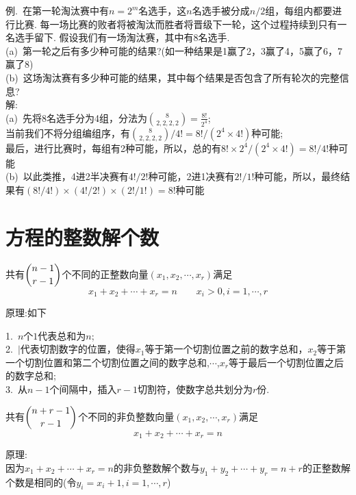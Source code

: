 例.\ 在第一轮淘汰赛中有$n=2^m$名选手，这$n$名选手被分成$n/2$组，每组内都要进行比赛. 每一场比赛的败者将被淘汰而胜者将晋级下一轮，这个过程持续到只有一名选手留下. 假设我们有一场淘汰赛，其中有8名选手.\\
(a)\ 第一轮之后有多少种可能的结果?(如一种结果是1赢了2，3赢了4，5赢了6，7赢了8)\\
(b)\ 这场淘汰赛有多少种可能的结果，其中每个结果是否包含了所有轮次的完整信息?\\
解:\\
(a)\ 先将8名选手分为4组，分法为$\binom{8}{2,2,2,2}=\frac{8!}{2^4}$;\\
当前我们不将分组编组序，有$\binom{8}{2,2,2,2}/4!=8!/(2^4\times 4!)$种可能;\\
最后，进行比赛时，每组有2种可能，所以，总的有$8!\times 2^4/(2^4\times 4!)=8!/4!$种可能\\
(b)\ 以此类推，4进2半决赛有$4!/2!$种可能，2进1决赛有$2!/1!$种可能，所以，最终结果有$(8!/4!)\times(4!/2!)\times(2!/1!)=8!$种可能\\[2ex]

\section{方程的整数解个数}
\begin{Theorem}
共有$\dbinom{n-1}{r-1}$个不同的正整数向量$(x_1,x_2,\cdots,x_r)$满足
\[x_1+x_2+\cdots+x_r=n\qquad x_i>0,i=1,\cdots,r\]
\end{Theorem}\vspace{1ex}
原理:如下\\
{\par\centering
{}
\par}
1.\ $n$个$1$代表总和为$n$;\\
2.\ $|$代表切割数字的位置，使得$x_1$等于第一个切割位置之前的数字总和，$x_2$等于第一个切割位置和第二个切割位置之间的数字总和,$\cdots$,$x_r$等于最后一个切割位置之后的数字总和;\\
3.\ 从$n-1$个间隔中，插入$r-1$切割符，使数字总共划分为$r$份.\\[2ex]

\begin{Theorem}\label{chap-one:01}
共有$\dbinom{n+r-1}{r-1}$个不同的非负整数向量$(x_1,x_2,\cdots,x_r)$满足
\[x_1+x_2+\cdots+x_r=n\]
\end{Theorem}\vspace{4ex}
原理:\\
因为$x_1+x_2+\cdots+x_r=n$的非负整数解个数与$y_1+y_2+\cdots+y_r=n+r$的正整数解个数是相同的(令$y_i=x_i+1,i=1,\cdots,r$)\\[1ex]

